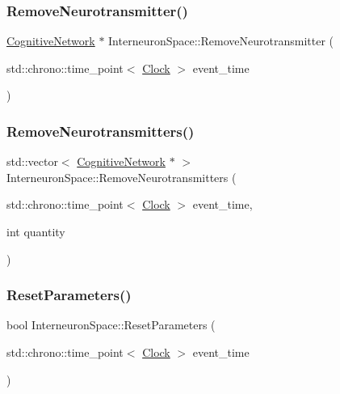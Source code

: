 \mbox{\label{classInterneuronSpace_aa46b5ce238b49425a68fcfd53ba1d8b7}} 
\subsubsection{\texorpdfstring{Remove\+Neurotransmitter()}{RemoveNeurotransmitter()}}
{\footnotesize\ttfamily \mbox{\hyperlink{classCognitiveNetwork}{Cognitive\+Network}} $\ast$ Interneuron\+Space\+::\+Remove\+Neurotransmitter (\begin{DoxyParamCaption}\item[{std\+::chrono\+::time\+\_\+point$<$ \mbox{\hyperlink{universe_8h_a0ef8d951d1ca5ab3cfaf7ab4c7a6fd80}{Clock}} $>$}]{event\+\_\+time }\end{DoxyParamCaption})}

\mbox{\label{classInterneuronSpace_a7b11f542ab7a3d293d5fcf5a1b522ac2}} 
\subsubsection{\texorpdfstring{Remove\+Neurotransmitters()}{RemoveNeurotransmitters()}}
{\footnotesize\ttfamily std\+::vector$<$ \mbox{\hyperlink{classCognitiveNetwork}{Cognitive\+Network}} $\ast$ $>$ Interneuron\+Space\+::\+Remove\+Neurotransmitters (\begin{DoxyParamCaption}\item[{std\+::chrono\+::time\+\_\+point$<$ \mbox{\hyperlink{universe_8h_a0ef8d951d1ca5ab3cfaf7ab4c7a6fd80}{Clock}} $>$}]{event\+\_\+time,  }\item[{int}]{quantity }\end{DoxyParamCaption})}

\mbox{\label{classInterneuronSpace_a3a9776e4a77b87374204468ca7974157}} 
\subsubsection{\texorpdfstring{Reset\+Parameters()}{ResetParameters()}}
{\footnotesize\ttfamily bool Interneuron\+Space\+::\+Reset\+Parameters (\begin{DoxyParamCaption}\item[{std\+::chrono\+::time\+\_\+point$<$ \mbox{\hyperlink{universe_8h_a0ef8d951d1ca5ab3cfaf7ab4c7a6fd80}{Clock}} $>$}]{event\+\_\+time }\end{DoxyParamCaption})}

